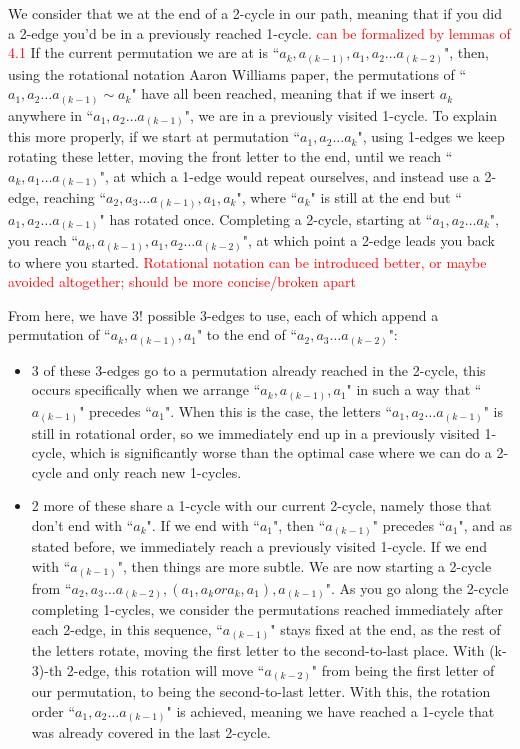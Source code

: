 \documentclass{article}
\theoremstyle{definition}
\newcommand{\edit}[1]{\textcolor{red}{#1}}
\newcommand{\rough}[1]{}%
\begin{document}
{\rough{Rotational notation, dealing with 2-cycles and the like}

We consider that we at the end of a 2-cycle in our path, meaning that if you did a 2-edge you'd be in a previously reached 1-cycle.\edit{ can be formalized by lemmas of 4.1} If the current permutation we are at is ``$a_k,a_{(k-1)},a_1, a_2 \dots a_{(k-2)}$", then, using the rotational notation Aaron Williams paper, the permutations of ``$a_1,a_2\dots  a_{(k-1)} \sim a_k$" have all been reached, meaning that if we insert $a_k$ anywhere in ``$a_1,a_2\dots  a_{(k-1)}$", we are in a previously visited 1-cycle. To explain this more properly, if we start at permutation ``$a_1,a_2\dots  a_k$", using 1-edges we keep rotating these letter, moving the front letter to the end, until we reach ``$a_k, a_1 \dots  a_{(k-1)}$", at which a 1-edge would repeat ourselves, and instead use a 2-edge, reaching ``$a_2,a_3 \dots  a_{(k-1)},a_1,a_k$", where ``$a_k$" is still at the end but ``$a_1,a_2\dots a_{(k-1)}$" has rotated once. Completing a 2-cycle, starting at ``$a_1,a_2\dots a_k$", you reach ``$a_k,a_{(k-1)},a_1, a_2 \dots  a_{(k-2)}$", at which point a 2-edge leads you back to where you started.\edit{ Rotational notation can be introduced better, or maybe avoided altogether; should be more concise/broken apart}

\vspace{1.75em}

\rough{3-edge shenanigans} From here, we have 3! possible 3-edges to use, each of which append a permutation of ``$a_k,a_(k-1),a_1$"  to the end of ``$a_2,a_3\dots  a_(k-2)$":

\begin{itemize}
    \item 3 of these 3-edges go to a permutation already reached in the 2-cycle, this occurs specifically when we arrange ``$a_k,a_(k-1),a_1$" in such a way that ``$a_(k-1)$" precedes ``$a_1$". When this is the case, the letters ``$a_1,a_2\dots  a_(k-1)$" is still in rotational order, so we  immediately end up in a previously visited 1-cycle, which is significantly worse than the optimal case where we can do a 2-cycle and only reach new 1-cycles.
    \item 2 more of these share a 1-cycle with our current 2-cycle, namely those that don't end with ``$a_k$". If we end with ``$a_1$", then ``$a_(k-1)$" precedes ``$a_1$", and as stated before, we immediately reach a previously visited 1-cycle. If we end with ``$a_{(k-1)}$", then things are more subtle. We are now starting a 2-cycle from ``$a_2,a_3\dots  a_{(k-2)}, (a_1,a_k or a_k,a_1), a_{(k-1)}$". As you go along the 2-cycle completing 1-cycles, we consider the permutations reached immediately after each 2-edge, in this sequence, ``$a_{(k-1)}$" stays fixed at the end, as the rest of the letters rotate, moving the first letter to the second-to-last place. With (k-3)-th 2-edge, this rotation will move ``$a_{(k-2)}$" from being the first letter of our permutation, to being the second-to-last letter. With this, the rotation order ``$a_1,a_2\dots  a_{(k-1)}$" is achieved, meaning we have reached a 1-cycle that was already covered in the last 2-cycle.
\end{itemize}

}
\end{document}
